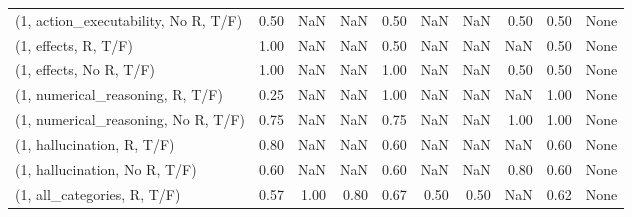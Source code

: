 \begin{table*}[h!]
\begin{adjustbox}{width=2\columnwidth,center}
\begin{tabular}{lrrr|rrr|rrr}
(1, action\_executability, No R, T/F) &                      0.50 &                   NaN &                       NaN &                          0.50 &                       NaN &                           NaN &                                   0.50 &                               0.50 &                                  None \\
(1, effects, R, T/F)                 &                      1.00 &                   NaN &                       NaN &                          0.50 &                       NaN &                           NaN &                                    NaN &                               0.50 &                                  None \\
(1, effects, No R, T/F)              &                      1.00 &                   NaN &                       NaN &                          1.00 &                       NaN &                           NaN &                                   0.50 &                               0.50 &                                  None \\
(1, numerical\_reasoning, R, T/F)     &                      0.25 &                   NaN &                       NaN &                          1.00 &                       NaN &                           NaN &                                    NaN &                               1.00 &                                  None \\
(1, numerical\_reasoning, No R, T/F)  &                      0.75 &                   NaN &                       NaN &                          0.75 &                       NaN &                           NaN &                                   1.00 &                               1.00 &                                  None \\
(1, hallucination, R, T/F)           &                      0.80 &                   NaN &                       NaN &                          0.60 &                       NaN &                           NaN &                                    NaN &                               0.60 &                                  None \\
(1, hallucination, No R, T/F)        &                      0.60 &                   NaN &                       NaN &                          0.60 &                       NaN &                           NaN &                                   0.80 &                               0.60 &                                  None \\
(1, all\_categories, R, T/F)          &                      0.57 &                  1.00 &                      0.80 &                          0.67 &                      0.50 &                          0.50 &                                    NaN &                               0.62 &                                  None \\

\end{tabular}
\end{adjustbox}
\end{table*}
